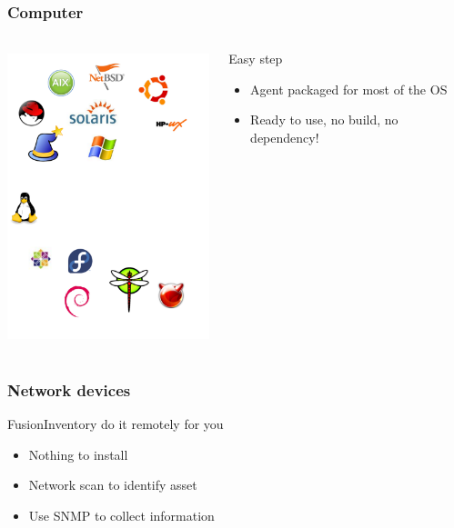 \documentclass{beamer}
\begin{document}
\begin{frame}

    \frametitle{Computer}
 \begin{columns}
 \begin{column}{0.15\textwidth}
         \includegraphics[height=8.5cm]{./pics/os.pdf}
 \end{column}
 \begin{column}{1.25\textwidth}
    \begin{block}{Easy step}
        \begin{itemize}
            \item Agent packaged for most of the OS
            \item Ready to use, no build, no dependency!
        \end{itemize}
    \end{block}


 \end{column}
\end{columns}




\end{frame}

\begin{frame}

    \frametitle{Network devices}

    \begin{block}{FusionInventory do it remotely for you}
        \begin{itemize}
            \item Nothing to install
            \item Network scan to identify asset
            \item Use SNMP to collect information
        \end{itemize}
    \end{block}

\end{frame}
\end{document}

